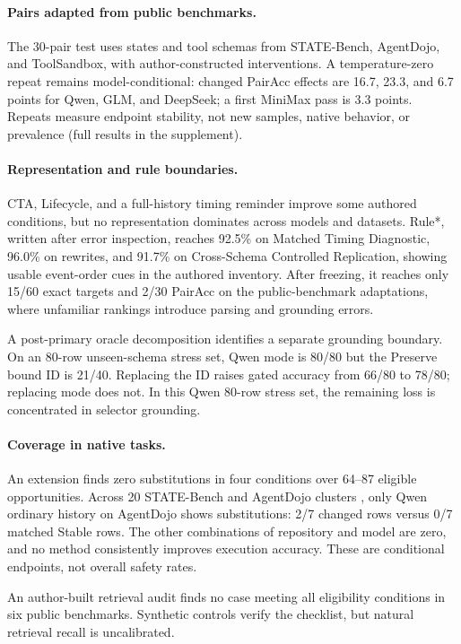 \documentclass[letterpaper]{article}
\newcommand{\PrimaryDiagnostic}{Matched Timing Diagnostic}
\newcommand{\NewSchemaReplication}{Cross-Schema Controlled Replication}
\begin{document}
\paragraph{Pairs adapted from public benchmarks.}
The 30-pair test uses states and tool schemas from STATE-Bench, AgentDojo, and ToolSandbox, with
author-constructed interventions. A temperature-zero repeat remains model-conditional: changed
PairAcc effects are 16.7, 23.3, and 6.7 points for Qwen, GLM, and DeepSeek; a first MiniMax pass is
3.3 points. Repeats measure endpoint stability, not new samples, native behavior, or prevalence
(full results in the supplement).

\paragraph{Representation and rule boundaries.}
CTA, Lifecycle, and a full-history timing reminder improve some authored conditions, but no
representation dominates across models and datasets. Rule*, written after error inspection,
reaches 92.5\% on \PrimaryDiagnostic{}, 96.0\% on rewrites, and 91.7\% on
\NewSchemaReplication{}, showing usable event-order cues in the authored inventory. After freezing,
it reaches only 15/60 exact targets and 2/30 PairAcc on the public-benchmark adaptations, where
unfamiliar rankings introduce parsing and grounding errors.

A post-primary oracle decomposition identifies a separate grounding boundary. On an 80-row
unseen-schema stress set, Qwen mode is 80/80 but the Preserve bound ID is 21/40. Replacing the ID
raises gated accuracy from 66/80 to 78/80; replacing mode does not. In this Qwen 80-row stress set,
the remaining loss is concentrated in selector grounding.

\paragraph{Coverage in native tasks.}
An extension finds zero substitutions in four conditions over 64--87 eligible opportunities.
Across 20 STATE-Bench and AgentDojo clusters
\cite{microsoft2026statebench,debenedetti2024agentdojo}, only Qwen ordinary history on AgentDojo
shows substitutions: 2/7 changed rows versus 0/7 matched Stable rows. The other combinations of
repository and model are zero, and no method consistently improves execution accuracy. These are
conditional endpoints, not overall safety rates.

An author-built retrieval audit finds no case meeting all eligibility conditions in six public
benchmarks. Synthetic controls verify the checklist, but natural retrieval recall is uncalibrated.
\end{document}
